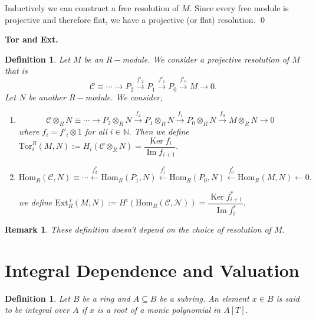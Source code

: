 \documentclass[11pt]{amsart}
\newtheorem{defn}[theorem]{Definition}
\newtheorem{remark}[theorem]{Remark}%
\newcommand{\NN}{\mathbb N}
\newcommand{\Hom}[1]{\text{Hom}_R\left(#1\right)}
\DeclareMathOperator{\im}{\text{Im}}
\DeclareMathOperator{\Ker}{\text{Ker}}
\begin{document}
Inductively we can construct a free resolution of $M$. Since every free module is projective and therefore flat, we have a projective (or flat) resolution. \qed

\textbf{Tor and Ext.}

\begin{defn}

Let $M$ be an $R-$module. We consider a projective resolution of $M$ that is $$\mathcal{C}\equiv \cdots\to P_2\xrightarrow{f'_2} P_1\xrightarrow{f'_1} P_0\xrightarrow{f'_0} M\to 0.$$ Let $N$ be another $R-$module. We consider, \begin{enumerate}

\item $$\mathcal{C}\otimes_R N\equiv \cdots\to P_2\otimes_R N\xrightarrow{f_2} P_1\otimes_R N\xrightarrow{f_1} P_0\otimes_R N\xrightarrow{f_0} M\otimes_R N\to 0$$ where $f_i=f'_i\otimes 1$ for all $i\in{\NN}.$ Then we define $\text{Tor}_i^R (M,N):=H_i(\mathcal{C}\otimes_R N)=\dfrac{\Ker f_i}{\im f_{i+1}}.$

\item $$\Hom{\mathcal{C},N}\equiv \cdots\xleftarrow{f^*_2}\Hom{P_1,N}\xleftarrow{f^*_1}\Hom{P_0,N}\xleftarrow{f^*_0}\Hom{M,N}\leftarrow 0.$$

we define $\text{Ext}^{~i}_R(M,N):=H^i(\Hom{\mathcal{C,N}})=\dfrac{\Ker f^*_{i+1}}{\im f^*_i}.$

\end{enumerate}

\end{defn}


\begin{remark}

These definition doesn't depend on the choice of resolution of $M.$

\end{remark}





















\section{Integral Dependence and Valuation}

\begin{defn}

Let $B$ be a ring and $A\subseteq B$ be a subring. An element $x\in B$ is said to be integral over $A$ if $x$ is a root of a monic polynomial in $A[T].$

\end{defn}
\end{document}
